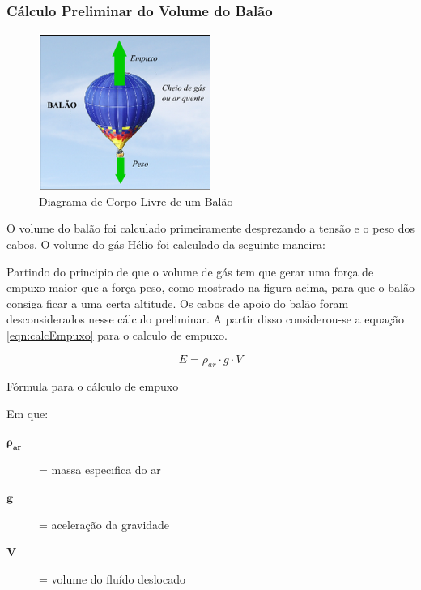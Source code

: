 	\subsubsection{Cálculo Preliminar do Volume do Balão}

	\begin{figure}[H]
		\centering
		\includegraphics[width=0.5\textwidth]{figuras/corpoLivreBalao}
		\caption[Diagrama de Corpo Livre de um Balão]{Diagrama de Corpo Livre de um Balão~\cite{justino}}
		\label{img:corpoLivreBalao}
	\end{figure}

	O volume do balão foi calculado primeiramente desprezando a tensão e o peso dos cabos. 	O volume do gás Hélio foi calculado da seguinte maneira:

	Partindo do principio de que o volume de gás tem que gerar uma força de empuxo maior que a força peso, como mostrado na figura acima, para que o balão consiga ficar a uma certa altitude. Os cabos de apoio do balão foram desconsiderados nesse cálculo preliminar. A partir disso considerou-se a equação \eqref{eqn:calcEmpuxo} para o calculo de empuxo.

	\begin{equacao}
		\begin{equation}
			E = \rho_{ar} \cdot g \cdot V
		\end{equation}
		\caption[Fórmula para o cálculo de empuxo]{Fórmula para o cálculo de empuxo~\cite[pp.~63--65]{munson}}
		\label{eqn:calcEmpuxo}
	\end{equacao}

	Em que:
	\begin{description}
		\item[$\boldsymbol{\rho_{ar}}$] = massa especıfica do ar
		\item[$\boldsymbol{g}$] = aceleração da gravidade
		\item[$\boldsymbol{V}$] = volume do fluído deslocado
	\end{description}

